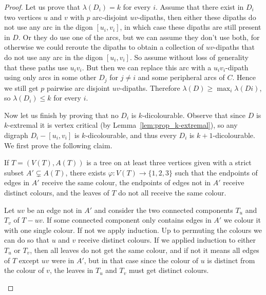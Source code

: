 \begin{proof}
Let us prove that $\lambda(D_i)=k$ for every $i$. Assume that there exist in $D_i$ two vertices $u$ and $v$ with $p$ arc-disjoint $uv$-dipaths, then either these dipaths do not use any arc in the digon $[u_i,v_i]$, in which case these dipaths are still present in $D$. Or they do use one of the arcs, but we can assume they don't use both, for otherwise we could reroute the dipaths to obtain a collection of $uv$-dipaths that do not use any arc in the digon $[u_i,v_i]$. So assume without loss of generality that these paths use $u_iv_i$. But then we can replace this arc with a $u_iv_i$-dipath using only arcs in some other $D_j$ for $j\neq i$ and some peripheral arcs of $C$. Hence we still get $p$ pairwise arc disjoint $uv$-dipaths. Therefore $\lambda(D) \geq\max_i \lambda(Di)$, so $\lambda(D_i)\leq k$ for every $i$.

Now let us finish by proving that no $D_i$ is $k$-dicolourable. Observe that since $D$ is $k$-extremal it is vertex critical (by Lemma~\ref{lem:prop_k-extremal}), so any digraph $D_i-[u_i,v_i]$ is $k$-dicolourable, and thus every $D_i$ is $k+1$-dicolourable. We first prove the following claim. 
\begin{claim}
    If $T=(V(T),A(T))$ is a tree on at least three vertices given with a strict subset $A'\subsetneq  A(T)$, there exists $\varphi : V(T)\to \{1,2,3\}$ such that the endpoints of edges in $A'$ receive the same colour, the endpoints of edges not in $A'$ receive distinct colours, and the leaves of $T$ do not all receive the same colour.
\end{claim}
\begin{proofclaim}
Let $uv$ be an edge not in $A'$ and consider the two connected components $T_u$ and $T_v$ of $T-uv$. If some connected component only contains edges in $A'$ we colour it with one single colour. If not we apply induction. Up to permuting the colours we can do so that $u$ and $v$ receive distinct colours. If we applied induction to either $T_u$ or $T_v$, then all leaves do not get the same colour, and if not it means all edges of $T$ except $uv$ were in $A'$, but in that case since the colour of $u$ is distinct from the colour of $v$, the leaves in $T_u$ and $T_v$ must get distinct colours.
\end{proofclaim}


\end{proof}
